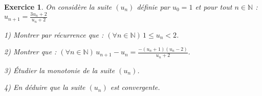 \documentclass[12pt,a4paper]{article}
\theoremstyle{mystyle}
\newtheorem{exo}{Exercice}
\begin{document}
\begin{multicols*}{2}
\begin{exo}

On considère la suite $(u_n)$ définie par $ u_0 = 1 $ et pour tout $ n \in \mathbb{N} $ :  
$ u_{n+1} = \frac{3u_n + 2}{u_n + 2} $  

1) Montrer par récurrence que : $ (\forall n \in \mathbb{N}) \, 1 \leq u_n < 2 $.  

2) Montrer que :  
$ (\forall n \in \mathbb{N}) \, u_{n+1} - u_n = \frac{-(u_n + 1)(u_n - 2)}{u_n + 2}. $  

3) Étudier la monotonie de la suite $(u_n)$.  

4) En déduire que la suite $(u_n)$ est convergente.  

\end{exo}




















\end{multicols*}
\end{document}
